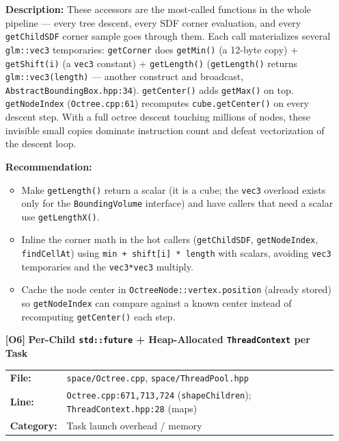 \documentclass[a4paper,12pt]{article}
\newcommand{\severitybox}[2]{%
  \colorbox{#1}{\makebox[2.5cm][c]{\textcolor{white}{\textbf{#2}}}}%
}
\begin{document}
\begin{enumerate}[leftmargin=*]
  \textbf{Description:}
  These accessors are the most-called functions in the whole pipeline — every
  tree descent, every SDF corner evaluation, and every \texttt{getChildSDF} corner
  sample goes through them. Each call materializes several \texttt{glm::vec3}
  temporaries: \texttt{getCorner} does \texttt{getMin()} (a 12-byte copy) +
  \texttt{getShift(i)} (a \texttt{vec3} constant) + \texttt{getLength()}
  (\texttt{getLength()} returns \texttt{glm::vec3(length)} — another construct and
  broadcast, \texttt{AbstractBoundingBox.hpp:34}). \texttt{getCenter()} adds
  \texttt{getMax()} on top. \texttt{getNodeIndex} (\texttt{Octree.cpp:61})
  recomputes \texttt{cube.getCenter()} on every descent step. With a full octree
  descent touching millions of nodes, these invisible small copies dominate
  instruction count and defeat vectorization of the descent loop.

  \textbf{Recommendation:}
  \begin{itemize}[leftmargin=*, itemsep=2pt]
    \item Make \texttt{getLength()} return a scalar (it is a cube; the
          \texttt{vec3} overload exists only for the \texttt{BoundingVolume}
          interface) and have callers that need a scalar use \texttt{getLengthX()}.
    \item Inline the corner math in the hot callers (\texttt{getChildSDF},
          \texttt{getNodeIndex}, \texttt{findCellAt}) using
          \texttt{min + shift[i] * length} with scalars, avoiding \texttt{vec3}
          temporaries and the \texttt{vec3*vec3} multiply.
    \item Cache the node center in \texttt{OctreeNode::vertex.position} (already
          stored) so \texttt{getNodeIndex} can compare against a known center
          instead of recomputing \texttt{getCenter()} each step.
  \end{itemize}

\item[\textbf{[O6]}] \textbf{Per-Child \texttt{std::future} + Heap-Allocated \texttt{ThreadContext} per Task}
  \hfill \severitybox{mediumcolor}{MEDIUM}

  \begin{tabular}{ll}
    \textbf{File:} & \texttt{space/Octree.cpp}, \texttt{space/ThreadPool.hpp} \\
    \textbf{Line:} & \texttt{Octree.cpp:671,713,724} (\texttt{shapeChildren});
                      \texttt{ThreadContext.hpp:28} (maps) \\
    \textbf{Category:} & Task launch overhead / memory \\
  \end{tabular}


\end{enumerate}
\end{document}
